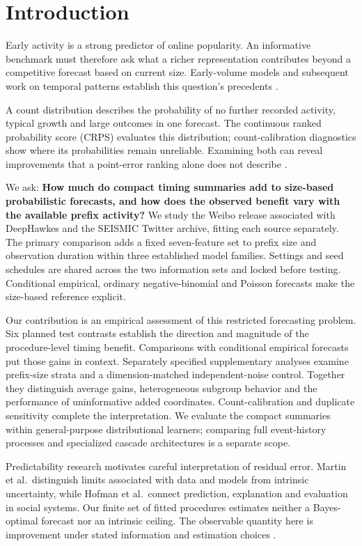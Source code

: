 \hypertarget{introduction}{%
\section{Introduction}}

Early activity is a strong predictor of online popularity. An informative benchmark must therefore ask what a richer representation contributes beyond a competitive forecast based on current size. Early-volume models and subsequent work on temporal patterns establish this question's precedents \cite{szabo2010,pinto2013,cheng2014}.

A count distribution describes the probability of no further recorded activity, typical growth and large outcomes in one forecast. The continuous ranked probability score (CRPS) evaluates this distribution; count-calibration diagnostics show where its probabilities remain unreliable. Examining both can reveal improvements that a point-error ranking alone does not describe \cite{proper2007,czado2009}.

We ask: \textbf{How much do compact timing summaries add to size-based probabilistic forecasts, and how does the observed benefit vary with the available prefix activity?} We study the Weibo release associated with DeepHawkes and the SEISMIC Twitter archive, fitting each source separately. The primary comparison adds a fixed seven-feature set to prefix size and observation duration within three established model families. Settings and seed schedules are shared across the two information sets and locked before testing. Conditional empirical, ordinary negative-binomial and Poisson forecasts make the size-based reference explicit.

Our contribution is an empirical assessment of this restricted forecasting problem. Six planned test contrasts establish the direction and magnitude of the procedure-level timing benefit. Comparisons with conditional empirical forecasts put those gains in context. Separately specified supplementary analyses examine prefix-size strata and a dimension-matched independent-noise control. Together they distinguish average gains, heterogeneous subgroup behavior and the performance of uninformative added coordinates. Count-calibration and duplicate sensitivity complete the interpretation. We evaluate the compact summaries within general-purpose distributional learners; comparing full event-history processes and specialized cascade architectures is a separate scope.

Predictability research motivates careful interpretation of residual error. Martin et al.~distinguish limits associated with data and models from intrinsic uncertainty, while Hofman et al.~connect prediction, explanation and evaluation in social systems. Our finite set of fitted procedures estimates neither a Bayes-optimal forecast nor an intrinsic ceiling. The observable quantity here is improvement under stated information and estimation choices \cite{martin2016,hofman2017}.


